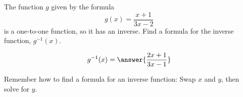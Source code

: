 \documentclass{ximera}
\author{Bobby Ramsey}
\begin{document}
\begin{exercise}




The function $g$ given by the formula
\[ g(x) = \frac{x+1}{3x-2} \]
is a one-to-one function, so it has an inverse.  Find a formula for the inverse function, $g^{-1}(x)$.

\[ g^{-1}(x) = \answer{\frac{2x+1}{3x-1}}\]

	\begin{hint}
		Remember how to find a formula for an inverse function: Swap $x$ and $y$, then solve for $y$.
	\end{hint}

\end{exercise}
\end{document}
